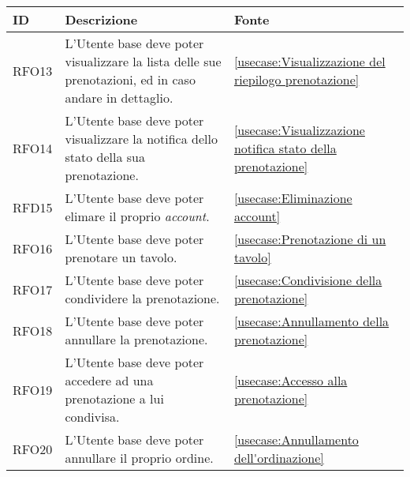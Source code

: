 \begin{table}[H]
	\renewcommand{\arraystretch}{1.5}
	\centering
	\begin{tabularx}{\textwidth}{l|X|p{2cm}}
		\textbf{ID} & \textbf{Descrizione}                                                                                           & \textbf{Fonte}                                                                                                     \\
		\hline
		RFO13       & L'Utente base deve poter visualizzare la lista delle sue prenotazioni, ed in caso andare in dettaglio.         & \autoref{usecase:Visualizzazione del riepilogo prenotazione} \\
		\hline
		RFO14       & L'Utente base deve poter visualizzare la notifica dello stato della sua prenotazione.                          & \autoref{usecase:Visualizzazione notifica stato della prenotazione}                                                \\
		\hline
		RFD15       & L'Utente base deve poter elimare il proprio \textit{account}.                                                  & \autoref{usecase:Eliminazione account}                                                                             \\
		\hline
		RFO16       & L'Utente base deve poter prenotare un tavolo.                                                                  & \autoref{usecase:Prenotazione di un tavolo}                                                                        \\
		\hline
		RFO17       & L'Utente base deve poter condividere la prenotazione.                                                          & \autoref{usecase:Condivisione della prenotazione}                                                                  \\
		\hline
		RFO18       & L'Utente base deve poter annullare la prenotazione.                                                            & \autoref{usecase:Annullamento della prenotazione}                                                                  \\
		\hline
		RFO19       & L'Utente base deve poter accedere ad una prenotazione a lui condivisa.										 & \autoref{usecase:Accesso alla prenotazione}                                                                        \\
		\hline
		RFO20       & L'Utente base deve poter annullare il proprio ordine.                                                          & \autoref{usecase:Annullamento dell'ordinazione}                                                                    \\

\end{tabularx}
\end{table}
